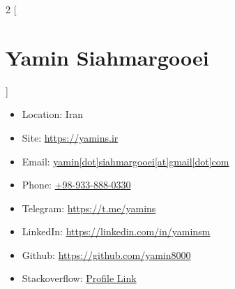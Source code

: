 \begin{multicols}{2}
[\section*{\LARGE{Yamin Siahmargooei}}]
    \begin{itemize}
        \item Location: Iran
        \item Site: \href{https://yamins.ir}{https://yamins.ir}
        \item Email: \href{mailto:yamin.siahmargooei@gmail.com}{yamin[dot]siahmargooei[at]gmail[dot]com}
        \item Phone: \href{tel:0989338880330}{+98-933-888-0330}
        \item Telegram: \href{https://t.me/yamins}{https://t.me/yamins}
        \item LinkedIn: \href{https://linkedin.com/in/yaminsm}{https://linkedin.com/in/yaminsm}
        \item Github: \href{https://github.com/yamin8000}{https://github.com/yamin8000}
        \item Stackoverflow: \href{https://stackoverflow.com/users/15055605/yamin}{Profile Link}
    \end{itemize}
\end{multicols}